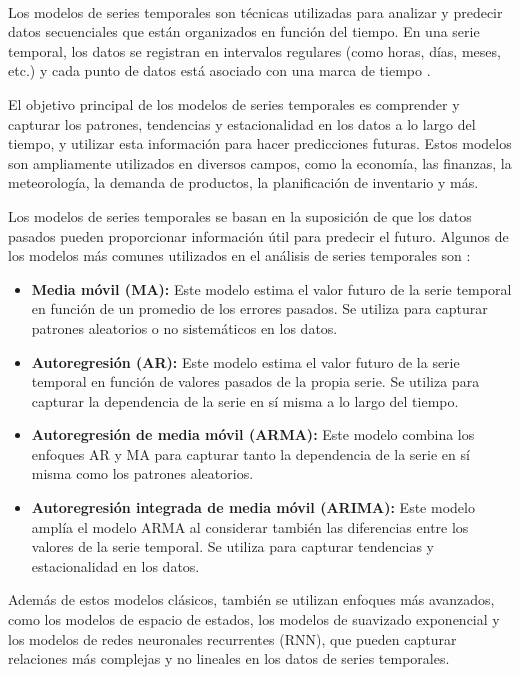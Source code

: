 \\
Los modelos de series temporales son técnicas utilizadas para analizar y predecir datos secuenciales que están organizados en función del tiempo. En una serie temporal, los datos se registran en intervalos regulares (como horas, días, meses, etc.) y cada punto de datos está asociado con una marca de tiempo \cite{time-series}.

El objetivo principal de los modelos de series temporales es comprender y capturar los patrones, tendencias y estacionalidad en los datos a lo largo del tiempo, y utilizar esta información para hacer predicciones futuras. Estos modelos son ampliamente utilizados en diversos campos, como la economía, las finanzas, la meteorología, la demanda de productos, la planificación de inventario y más.

Los modelos de series temporales se basan en la suposición de que los datos pasados pueden proporcionar información útil para predecir el futuro. Algunos de los modelos más comunes utilizados en el análisis de series temporales son \cite{time-series}:
\begin{itemize}
    \item \textbf{Media móvil (MA):} Este modelo estima el valor futuro de la serie temporal en función de un promedio de los errores pasados. Se utiliza para capturar patrones aleatorios o no sistemáticos en los datos.
    \item \textbf{Autoregresión (AR):} Este modelo estima el valor futuro de la serie temporal en función de valores pasados de la propia serie. Se utiliza para capturar la dependencia de la serie en sí misma a lo largo del tiempo.
    \item \textbf{Autoregresión de media móvil (ARMA):} Este modelo combina los enfoques AR y MA para capturar tanto la dependencia de la serie en sí misma como los patrones aleatorios.
    \item \textbf{Autoregresión integrada de media móvil (ARIMA):} Este modelo amplía el modelo ARMA al considerar también las diferencias entre los valores de la serie temporal. Se utiliza para capturar tendencias y estacionalidad en los datos.
\end{itemize}

Además de estos modelos clásicos, también se utilizan enfoques más avanzados, como los modelos de espacio de estados, los modelos de suavizado exponencial y los modelos de redes neuronales recurrentes (RNN), que pueden capturar relaciones más complejas y no lineales en los datos de series temporales.


